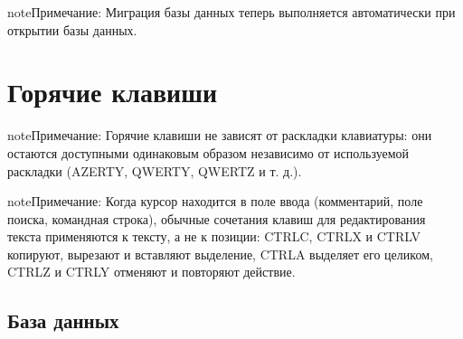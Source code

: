\documentclass[letterpaper,10pt,russian]{sphinxmanual}
\begin{document}
\begin{sphinxadmonition}{note}{Примечание:}
\sphinxAtStartPar
Миграция базы данных теперь выполняется автоматически при открытии базы данных.
\end{sphinxadmonition}

\sphinxstepscope


\section{Горячие клавиши}
\label{\detokenize{raccourcis:raccourcis-clavier}}\label{\detokenize{raccourcis:raccourcis}}\label{\detokenize{raccourcis::doc}}
\begin{sphinxadmonition}{note}{Примечание:}
\sphinxAtStartPar
Горячие клавиши не зависят от раскладки клавиатуры: они остаются доступными одинаковым образом независимо от используемой раскладки (AZERTY, QWERTY, QWERTZ и т. д.).
\end{sphinxadmonition}

\begin{sphinxadmonition}{note}{Примечание:}
\sphinxAtStartPar
Когда курсор находится в поле ввода (комментарий, поле поиска, командная строка), обычные сочетания клавиш для редактирования текста применяются к тексту, а не к позиции: CTRL\sphinxhyphen{}C, CTRL\sphinxhyphen{}X и CTRL\sphinxhyphen{}V копируют, вырезают и вставляют выделение, CTRL\sphinxhyphen{}A выделяет его целиком, CTRL\sphinxhyphen{}Z и CTRL\sphinxhyphen{}Y отменяют и повторяют действие.
\end{sphinxadmonition}


\subsection{База данных}
\label{\detokenize{raccourcis:base-de-donnees}}\label{\detokenize{raccourcis:raccourcis-generaux}}
\end{document}
